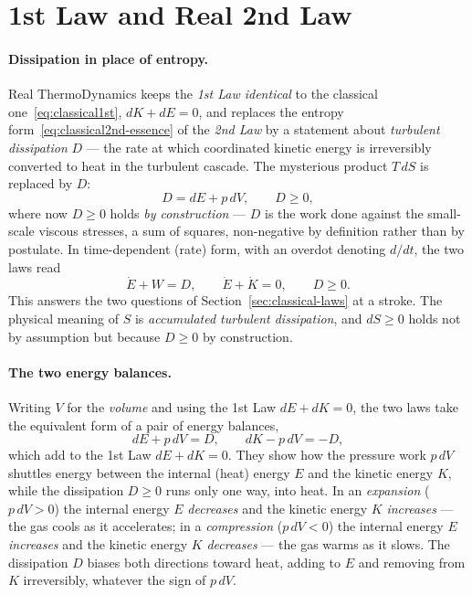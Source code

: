\section{1st Law and Real 2nd Law}\label{sec:fp2L}

\paragraph{Dissipation in place of entropy.}
Real ThermoDynamics keeps the \emph{1st Law identical} to the classical
one~\eqref{eq:classical1st}, $dK + dE = 0$, and replaces the entropy
form~\eqref{eq:classical2nd-essence} of the \emph{2nd Law} by a statement
about \emph{turbulent dissipation} $D$ --- the rate at which coordinated
kinetic energy is irreversibly converted to heat in the turbulent
cascade. The mysterious product $T\,dS$ is replaced by $D$:
\begin{equation}\label{eq:realtd2nd}
D = dE + p\,dV, \qquad D \ge 0,
\end{equation}
where now $D \ge 0$ holds \emph{by construction} --- $D$ is the work done
against the small-scale viscous stresses, a sum of squares, non-negative
by definition rather than by postulate. In time-dependent (rate) form,
with an overdot denoting $d/dt$, the two laws read
\begin{equation}\label{eq:realtd-rate}
\dot E + W = D, \qquad \dot E + \dot K = 0, \qquad D \ge 0.
\end{equation}
This answers the two questions of Section~\ref{sec:classical-laws} at a
stroke. The physical meaning of $S$ is \emph{accumulated turbulent
dissipation}, and $dS \ge 0$ holds not by assumption but because
$D \ge 0$ by construction.

\paragraph{The two energy balances.}
Writing $V$ for the \emph{volume} and using the 1st Law $dE + dK = 0$, the
two laws take the equivalent form of a pair of energy balances,
\begin{equation}\label{eq:realtd-split}
dE + p\,dV = D, \qquad dK - p\,dV = -D,
\end{equation}
which add to the 1st Law $dE + dK = 0$. They show how the pressure work $p\,dV$ shuttles
energy between the internal (heat) energy $E$ and the kinetic energy $K$, while
the dissipation $D \ge 0$ runs only one way, into heat. In an \emph{expansion}
($p\,dV > 0$) the internal energy $E$ \emph{decreases} and the kinetic energy
$K$ \emph{increases} --- the gas cools as it accelerates; in a \emph{compression}
($p\,dV < 0$) the internal energy $E$ \emph{increases} and the kinetic energy
$K$ \emph{decreases} --- the gas warms as it slows. The dissipation $D$ biases
both directions toward heat, adding to $E$ and removing from $K$ irreversibly,
whatever the sign of $p\,dV$.

